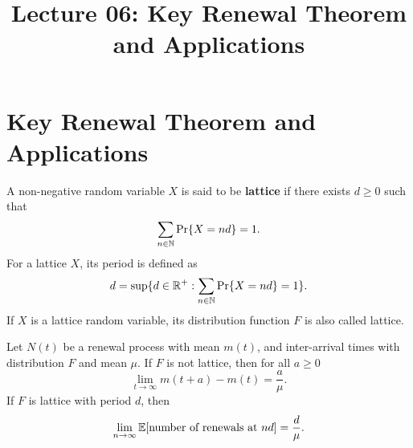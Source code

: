 \documentclass[a4paper,10pt,english]{article}
\title{Lecture 06: Key Renewal Theorem and Applications}
\author{}
\begin{document}
\maketitle
\section{Key Renewal Theorem and Applications}
\begin{defn} A non-negative random variable $X$ is said to be \textbf{lattice} if there exists $d \geq 0$ such that 
\begin{equation*}
\sum_{n\in\mathbb{N}}\Pr\{X = nd\} = 1.
\end{equation*}
For a lattice $X$, its period is defined as 
\begin{equation*}
d = \sup\{ d \in\mathbb{R}^+: \sum_{n\in\mathbb{N}}\Pr\{X = nd\} = 1 \}.
\end{equation*}
If $X$ is a lattice random variable, its distribution function $F$ is also called lattice.
\end{defn}
\begin{thm} Let $N(t)$ be a renewal process with mean $m(t)$, and inter-arrival times with distribution $F$ and mean $\mu$. If $F$ is not lattice, then for all $a \geq 0$
\begin{equation*}
\lim_{t \to \infty} m(t+a) -m(t) = \frac{a}{\mu}.
\end{equation*}
If $F$ is lattice with period $d$, then 
\begin{equation*}
\lim_{n \to \infty} \mathbb{E}[\text{number of renewals at } nd] = \frac{d}{\mu}.
\end{equation*}
\end{thm}
\end{document}
